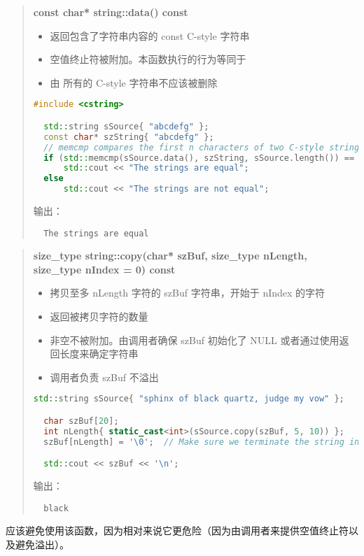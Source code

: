 \documentclass[../../LearnCpp.tex]{subfiles}
\begin{document}
\begin{quotation}
  \textbf{const char* string::data() const}

  \begin{itemize}
    \item 返回包含了字符串内容的 const C-style 字符串
    \item 空值终止符被附加。本函数执行的行为等同于 
    \item 由  所有的 C-style 字符串不应该被删除
  \end{itemize}

  \begin{lstlisting}[language=C++]
  #include <cstring>

  std::string sSource{ "abcdefg" };
  const char* szString{ "abcdefg" };
  // memcmp compares the first n characters of two C-style strings and returns 0 if they are equal
  if (std::memcmp(sSource.data(), szString, sSource.length()) == 0)
      std::cout << "The strings are equal";
  else
      std::cout << "The strings are not equal";
  \end{lstlisting}

  输出：

  \begin{lstlisting}
  The strings are equal
  \end{lstlisting}
\end{quotation}

\begin{quotation}
  \textbf{size\_type string::copy(char* szBuf, size\_type nLength, size\_type nIndex = 0) const}

  \begin{itemize}
    \item 拷贝至多 nLength 字符的 szBuf 字符串，开始于 nIndex 的字符
    \item 返回被拷贝字符的数量
    \item 非空不被附加。由调用者确保 szBuf 初始化了 NULL 或者通过使用返回长度来确定字符串
    \item 调用者负责 szBuf 不溢出
  \end{itemize}

  \begin{lstlisting}[language=C++]
  std::string sSource{ "sphinx of black quartz, judge my vow" };

  char szBuf[20];
  int nLength{ static_cast<int>(sSource.copy(szBuf, 5, 10)) };
  szBuf[nLength] = '\0';  // Make sure we terminate the string in the buffer

  std::cout << szBuf << '\n';
  \end{lstlisting}

  输出：

  \begin{lstlisting}
  black
  \end{lstlisting}
\end{quotation}

应该避免使用该函数，因为相对来说它更危险（因为由调用者来提供空值终止符以及避免溢出）。
\end{document}

